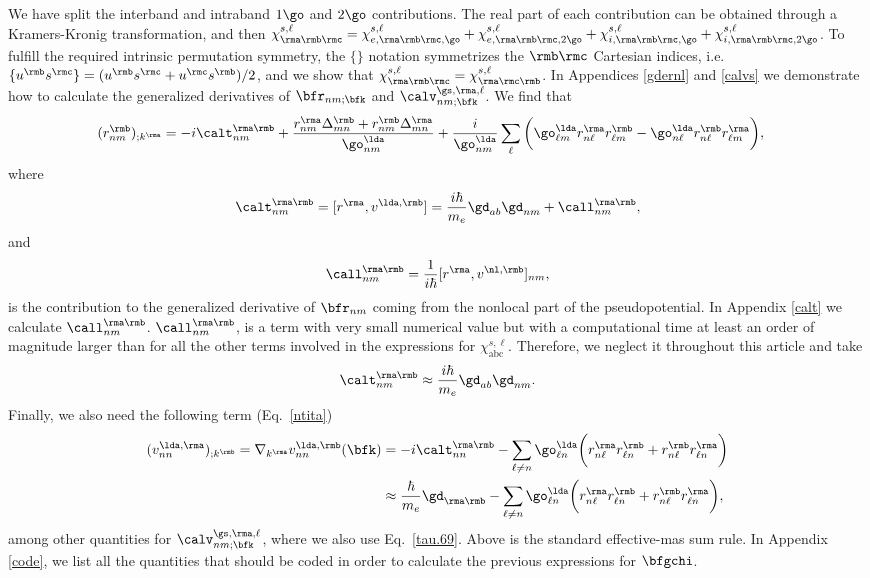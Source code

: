 \documentclass[floatfix,prb,aps,superscriptaddress,11pt,preprint,letterpaper]{revtex4}
\begin{document}
We have split the interband and intraband $1\go$ and $2\go$
contributions. The real part of each contribution can be obtained through
a Kramers-Kronig transformation,\cite{nicolas} and then
$\chi^{s,\ell}_{\rma\rmb\rmc}=\chi^{s,\ell}_{e,\rma\rmb\rmc,\go}+\chi^{s,\ell}_{e,\rma\rmb\rmc,2\go}+\chi^{s,\ell}_{i,\rma\rmb\rmc,\go}+\chi^{s,\ell}_{i,\rma\rmb\rmc,2\go}
$.
To fulfill the required intrinsic permutation symmetry,\cite{rashkeevPRB98} 
the $\{\}$ notation symmetrizes the $\rmb\rmc$ Cartesian indices, i.e. 
$\{u^{\rmb}s^{\rmc}\}=(u^{\rmb}s^{\rmc}+u^{\rmc}s^{\rmb})/2$,
and we show that
$\chi_{\rma\rmb\rmc}^{s,\ell}=\chi_{\rma\rmc\rmb}^{s,\ell}$.
In Appendices \ref{gdernl} and \ref{calvs} we demonstrate how to calculate  
the generalized derivatives of $\bfr_{nm;\bfk}$ and
$\calv^{\gs,\rma,\ell}_{nm;\bfk}$. 
We find that
\begin{align}\label{rgen.69}
(r^{\rmb}_{nm})_{;k^{\rma}}
&=
-i\calt^{\rma\rmb}_{nm}
+
\frac{
r^{\rma}_{nm}
\Delta^{\rmb}_{mn}
+r^{\rmb}_{nm}
\Delta^{\rma}_{mn}
}
{\go^\lda_{nm}}
+
\frac{i}{\go^\lda_{nm}}
\sum_{\ell}
\bigg(
\go^\lda_{\ell m}
r^{\rma}_{n\ell}
r^{\rmb}_{\ell m}
-
\go^\lda_{n\ell}
r^{\rmb}_{n\ell}
r^{\rma}_{\ell m}
\bigg)
,
\end{align}
where
\begin{align}\label{tau.1}
\calt_{nm}^{\rma\rmb}
=
[r^{\rma},v^{\lda,\rmb}]= 
\frac{i\hbar}{m_e}\gd_{ab}\gd_{nm}+
\call_{nm}^{\rma\rmb}
,
\end{align}  
and
\begin{align}\label{tau.2}
\call_{nm}^{\rma\rmb}
=
\frac{1}{i\hbar}[r^{\rma},v^{\nl,\rmb}]_{nm}
,
\end{align}
is the contribution to the generalized derivative of $\bfr_{nm}$
coming from the nonlocal part of the pseudopotential.
In Appendix \ref{calt} we calculate
$\call^{\rma\rmb}_{nm}$. $\call^{\rma\rmb}_{nm}$, 
is a term with very small numerical value but with a computational time 
at least an order of magnitude larger
than for all the other terms involved in the expressions for 
$\chi^{s,\ell}_{\mathrm{abc}}$.\cite{valerie}
Therefore, we neglect it throughout this article and take
\begin{align}\label{tau.69}
\calt_{nm}^{\rma\rmb}
\approx
\frac{i\hbar}{m_e}\gd_{ab}\gd_{nm}
.
\end{align} 
Finally,
we also need the following term (Eq.~\eqref{ntita})
\begin{align}\label{a.3c}
(v^{\lda,\rma}_{nn})_{;k^\rmb}
=
\nabla_{k^{\rma}}  
v^{\lda,\rmb}_{nn}(\bfk)
&=
-i\calt^{\rma\rmb}_{nn}
-
\sum_{\ell\ne n}
\go^\lda_{\ell n}
\bigg(  
r^{\rma}_{n\ell}  
r^\rmb_{\ell n}
+  
r^\rmb_{n\ell}  
r^{\rma}_{\ell n}
\bigg)
\nonumber\\
&\approx
\frac{\hbar}{m_e}\gd_{\rma\rmb}
-
\sum_{\ell\ne n}
\go^\lda_{\ell n}
\bigg(  
r^{\rma}_{n\ell}  
r^\rmb_{\ell n}
+  
r^\rmb_{n\ell}  
r^{\rma}_{\ell n}
\bigg)
,
\end{align}  
among other quantities for $\calv^{\gs,\rma,\ell}_{nm;\bfk}$, where we 
also use Eq.~\eqref{tau.69}. Above is the standard effective-mas sum rule.
\cite{ashcroft_solid_1976} 
In Appendix \ref{code}, we list all the quantities that should be
coded in order to calculate the previous expressions for $\bfgchi$.
\end{document}
